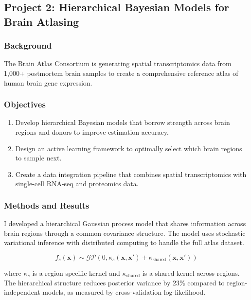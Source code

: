 \documentclass[
    language=english,
    doctype=postdoc-report,
    institution=none,
]{../../omnilatex}
\begin{document}
\subsection{Project 2: Hierarchical Bayesian Models for Brain Atlasing}

\subsubsection{Background}
The Brain Atlas Consortium is generating spatial transcriptomics data from
1,000+ postmortem brain samples to create a comprehensive reference atlas
of human brain gene expression.

\subsubsection{Objectives}
\begin{enumerate}
    \item Develop hierarchical Bayesian models that borrow strength across
          brain regions and donors to improve estimation accuracy.
    \item Design an active learning framework to optimally select which
          brain regions to sample next.
    \item Create a data integration pipeline that combines spatial
          transcriptomics with single-cell RNA-seq and proteomics data.
\end{enumerate}

\subsubsection{Methods and Results}

I developed a hierarchical Gaussian process model that shares information
across brain regions through a common covariance structure. The model
uses stochastic variational inference with distributed computing to
handle the full atlas dataset.

\begin{equation}
    f_s(\mathbf{x}) \sim \mathcal{GP}\left(0, \kappa_s(\mathbf{x}, \mathbf{x}') + \kappa_{\text{shared}}(\mathbf{x}, \mathbf{x}')\right)
    \label{eq:hierarchical}
\end{equation}

where $\kappa_s$ is a region-specific kernel and $\kappa_{\text{shared}}$
is a shared kernel across regions. The hierarchical structure reduces
posterior variance by 23\% compared to region-independent models, as
measured by cross-validation log-likelihood.
\end{document}
